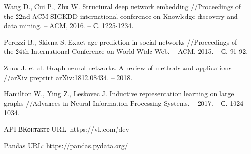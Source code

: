 \begin{thebibliography}{9}
Wang D., Cui P., Zhu W. Structural deep network embedding //Proceedings of the 22nd ACM SIGKDD international conference on Knowledge discovery and data mining. – ACM, 2016. – С. 1225-1234.

Perozzi B., Skiena S. Exact age prediction in social networks //Proceedings of the 24th International Conference on World Wide Web. – ACM, 2015. – С. 91-92.

Zhou J. et al. Graph neural networks: A review of methods and applications //arXiv preprint arXiv:1812.08434. – 2018.

Hamilton W., Ying Z., Leskovec J. Inductive representation learning on large graphs //Advances in Neural Information Processing Systems. – 2017. – С. 1024-1034.

API ВКонтакте URL: https://vk.com/dev

Pandas URL: https://pandas.pydata.org/

\end{thebibliography}
\endgroup

\clearpage